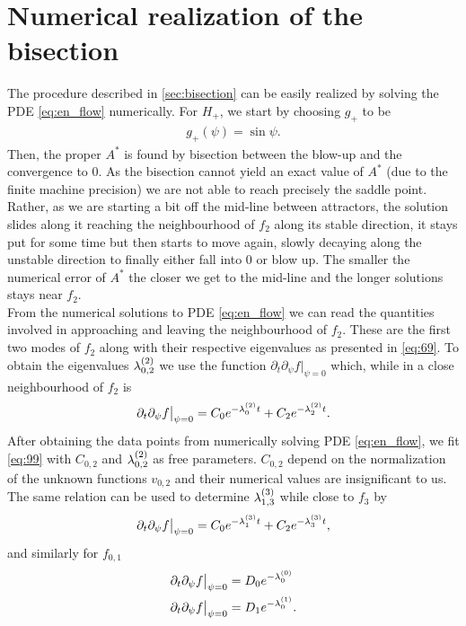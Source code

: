 \section{Numerical realization of the bisection}
\label{sec:numer-real-mount}

The procedure described in \ref{sec:bisection} can be easily realized
by solving the PDE \eqref{eq:en_flow} numerically. For $H_+$, we start
by choosing $g_+$ to be
\begin{align}
  \label{eq:98}
  g_+(\psi)=\sin\psi.
\end{align}
Then, the proper $A^*$ is found by bisection between the blow-up and
the convergence to $0$. As the bisection cannot yield an exact value
of $A^*$ (due to the finite machine precision) we are not able to
reach precisely the saddle point. Rather, as we are starting a bit off
the mid-line between attractors, the solution slides along it reaching
the neighbourhood of $f_2$ along its stable direction, it stays put
for some time but then starts to move again, slowly decaying along the
unstable direction to finally either fall into $0$ or blow up. The
smaller the numerical error of $A^*$ the closer we get to the mid-line
and the longer solutions stays near $f_2$.\\

From the numerical solutions to PDE \eqref{eq:en_flow} we can read the
quantities involved in approaching and leaving the neighbourhood of
$f_2$. These are the first two modes of $f_2$ along with their
respective eigenvalues as presented in \eqref{eq:69}. To obtain the
eigenvalues $\lb{2}{0,2}$ we use the function $\partial_t\partial_\psi
f\big|_{\psi=0}$ which, while in a close neighbourhood of $f_2$ is
\begin{align}
  \label{eq:99}
  \partial_t\partial_\psi
  f\big|_{\psi=0}=C_0e^{-\lb{2}{0}t}+C_2e^{-\lb{2}{2}t}.
\end{align}
After obtaining the data points from numerically solving PDE
\eqref{eq:en_flow}, we fit \eqref{eq:99} with $C_{0,2}$ and
$\lb{2}{0,2}$ as free parameters.  $C_{0,2}$ depend on the
normalization of the unknown functions $v_{0,2}$ and their numerical
values are insignificant to us. The same relation can be used to
determine $\lb{3}{1,3}$ while close to $f_3$ by
\begin{align}
  \label{eq:101}
  \partial_t\partial_\psi
  f\big|_{\psi=0}=C_0e^{-\lb{3}{1}t}+C_2e^{-\lb{3}{3}t},
\end{align}
and similarly for $f_{0,1}$
\begin{align}
  \label{eq:100}
  \partial_t\partial_\psi f\big|_{\psi=0}&=D_{0}e^{-\lb{0}{0}} \\
  \label{eq:102}
  \partial_t\partial_\psi f\big|_{\psi=0}&=D_{1}e^{-\lb{1}{0}}.
\end{align}

